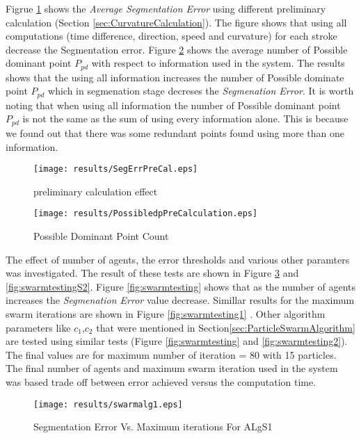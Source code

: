 Figrue \ref{fig:SegErrPreCal} shows the \textit{Average Segmentation Error} using different preliminary calculation (Section \ref{sec:CurvatureCalculation}). The figure shows that using all computations (time difference, direction, speed and curvature) for each stroke decrease the Segmentation error. Figure \ref{fig:PossibledpPreCalculation} shows the average number of Possible dominant point $P_{pd}$ with respect to information used in the system. The results shows that the using all information increases the number of Possible dominate point $P_{pd}$ which in segmenation stage decreses the \textit{Segmenation Error}. It is worth noting that when using all information the number of Possible dominant point $P_{pd}$ is not the same as the sum of using every information alone. This is because we found out that there was some redundant points found using more than one information.  


   
\begin{figure}
	\centering
		\texttt{[image: results/SegErrPreCal.eps]}
	\caption{preliminary calculation effect}
	\label{fig:SegErrPreCal}
\end{figure}
 
 
\begin{figure}
	\centering
		\texttt{[image: results/PossibledpPreCalculation.eps]}
	\caption{Possible Dominant Point Count}
	\label{fig:PossibledpPreCalculation}
\end{figure}

	 	
 The effect of number of agents, the error thresholds and various other paramters was investigated. The result of these tests are shown in Figure \ref{fig:swarmtestingS1} and  \ref{fig:swarmtestingS2}. Figure \ref{fig:swarmtesting} shows that as the number of agents increases the \textit{Segmenation Error} value decrease. Simillar results for the maximum swarm iterations are shown in Figure \ref{fig:swarmtesting1} . Other algorithm parameters like $c_1$,$c_2$ that were mentioned in Section\ref{sec:ParticleSwarmAlgorithm} are tested using similar tests (Figure \ref{fig:swarmtesting} and \ref{fig:swarmtesting2}). The final values are for maximum number of iteration = 80 with 15 particles. The final number of agents and maximum swarm iteration used in the system was based trade off between error achieved versus the computation time. 
   
   
    
 \begin{figure}
	\centering		
	 \texttt{[image: results/swarmalg1.eps]}
	 	\caption{Segmentation Error Vs. Maximum iterations For ALgS1}
	 	\label{fig:swarmtestingS1}
\end{figure} 


